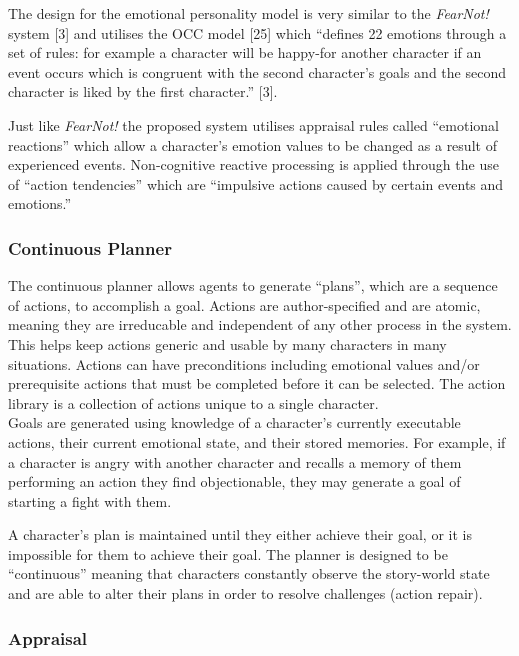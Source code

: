 \documentclass{sig-alternate-05-2015}
\begin{document}
The design for the emotional personality model is very similar to the \textit{FearNot!} system [3] and utilises the OCC model [25] which ``defines 22 emotions through a set of rules: for example a character will be happy-for another  character if an event occurs which is congruent with the second character's goals and the second character is liked by the first character.'' [3].

Just like \textit{FearNot!} the proposed system utilises appraisal rules called ``emotional reactions'' which allow a character's emotion values to be changed as a result of experienced events. Non-cognitive reactive processing is applied through the use of ``action tendencies'' which are ``impulsive actions caused by certain events and emotions.''\\

\subsubsection{Continuous Planner}
\noindent The continuous planner allows agents to generate ``plans'', which are a sequence of actions, to accomplish a goal. Actions are author-specified and are atomic, meaning they are irreducable and independent of any other process in the system. This helps keep actions generic and usable by many characters in many situations. Actions can have preconditions including emotional values and/or prerequisite actions that must be completed before it can be selected. The action library is a collection of actions unique to a single character.\\

\noindent Goals are generated using knowledge of a character's currently executable actions, their current emotional state, and their stored memories. For example, if a character is angry with another character and recalls a memory of them performing an action they find objectionable, they may generate a goal of starting a fight with them.

A character's plan is maintained until they either achieve their goal, or it is impossible for them to achieve their goal. The planner is designed to be ``continuous'' meaning that characters constantly observe the story-world state and are able to alter their plans in order to resolve challenges (action repair).

\subsubsection{Appraisal}
\end{document}
